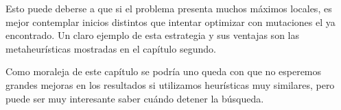 Esto puede deberse a que si el problema presenta muchos máximos locales, es mejor contemplar inicios distintos que intentar optimizar con mutaciones el ya encontrado. Un claro ejemplo de esta estrategia 
y sus ventajas son las metaheurísticas mostradas en 
el capítulo segundo. 


Como moraleja de este capítulo se podría uno queda con  que no esperemos grandes mejoras en los resultados si utilizamos heurísticas muy similares, pero puede ser muy interesante saber cuándo detener la búsqueda. 